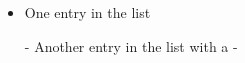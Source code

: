 \documentclass[a4paper]{article}
\begin{document}


\begin{itemize}
	\item One entry in the list
	\item[-] Another entry in the list with a -
\end{itemize}
\end{document}

